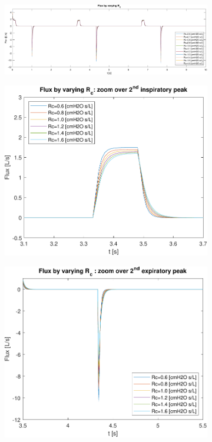 \begin{figure}[t!]
\begin{subfigure}{\linewidth}
\centering
\includegraphics[width=0.95\linewidth]{../model/data_log/Rc_flux_total.pdf}
\caption{}
\end{subfigure}\hfill
\begin{subfigure}{0.5\linewidth}
	\centering
	\includegraphics[width=0.95\linewidth]{../model/data_log/Rc_flux_zoom1.pdf}
	\caption{}
\end{subfigure}\hfill
\begin{subfigure}{0.5\linewidth}
	\centering
	\includegraphics[width=0.95\linewidth]{../model/data_log/Rc_flux_zoom2.pdf}

\end{subfigure}
\end{figure}

